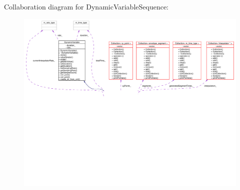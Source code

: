 Collaboration diagram for Dynamic\-Variable\-Sequence:\begin{figure}[H]
\begin{center}
\leavevmode
\includegraphics[width=420pt]{classDynamicVariableSequence__coll__graph}
\end{center}
\end{figure}
